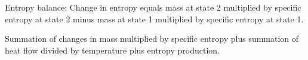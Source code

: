 Entropy balance:  
Change in entropy equals mass at state 2 multiplied by specific entropy at state 2 minus mass at state 1 multiplied by specific entropy at state 1.  

Summation of changes in mass multiplied by specific entropy plus summation of heat flow divided by temperature plus entropy production.